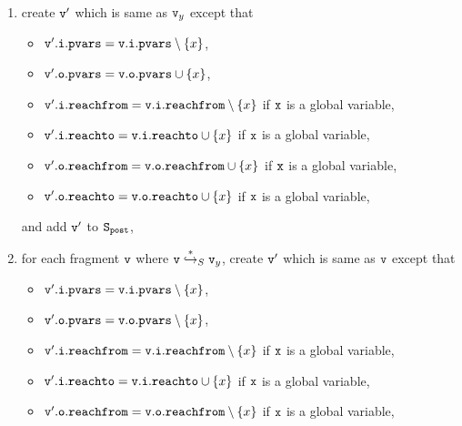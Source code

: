 \begin{description}
\begin{enumerate}
\item create $\mathtt{v}'$ which is same as $\mathtt{v}_y$ except that
\begin{itemize}
\item $\mathtt{v}'.\mathtt{i}.\mathtt{pvars} = \mathtt{v}.\mathtt{i}.\mathtt{pvars} \setminus \left\{x\right\}$,
\item $\mathtt{v}'.\mathtt{o}.\mathtt{pvars} = \mathtt{v}.\mathtt{o}.\mathtt{pvars} \cup \left\{x\right\}$,
\item $\mathtt{v}'.\mathtt{i}.\mathtt{reachfrom} = \mathtt{v}.\mathtt{i}.\mathtt{reachfrom} \setminus \left\{x\right\}$ if $\tt x$ is a global variable,
\item $\mathtt{v}'.\mathtt{i}.\mathtt{reachto} = \mathtt{v}.\mathtt{i}.\mathtt{reachto} \cup \left\{x\right\}$ if $\tt x$ is a global variable,
 \item $\mathtt{v}'.\mathtt{o}.\mathtt{reachfrom} = \mathtt{v}.\mathtt{o}.\mathtt{reachfrom} \cup \left\{x\right\}$ if $\tt x$ is a global variable,
 \item $\mathtt{v}'.\mathtt{o}.\mathtt{reachto} = \mathtt{v}.\mathtt{o}.\mathtt{reachto} \cup \left\{x\right\}$ if $\tt x$ is a global variable,
\end{itemize}
and add $\mathtt{v}'$ to $\tt S_{post}$,
\item  for each fragment $\mathtt{v}$ where $\mathtt{v} \overset{*}\hookrightarrow_S \mathtt{v}_y$, create $\mathtt{v}'$ which is same as $\mathtt{v}$ except that
\begin{itemize}
\item $\mathtt{v}'.\mathtt{i}.\mathtt{pvars} = \mathtt{v}.\mathtt{i}.\mathtt{pvars} \setminus \left\{x\right\}$,
\item $\mathtt{v}'.\mathtt{o}.\mathtt{pvars} = \mathtt{v}.\mathtt{o}.\mathtt{pvars} \setminus \left\{x\right\}$,
\item $\mathtt{v}'.\mathtt{i}.\mathtt{reachfrom} = \mathtt{v}.\mathtt{i}.\mathtt{reachfrom} \setminus \left\{x\right\}$ if $\tt x$ is a global variable,

\item $\mathtt{v}'.\mathtt{i}.\mathtt{reachto} = \mathtt{v}.\mathtt{i}.\mathtt{reachto} \cup \left\{x\right\}$ if $\tt x$ is a global variable,
\item $\mathtt{v}'.\mathtt{o}.\mathtt{reachfrom} = \mathtt{v}.\mathtt{o}.\mathtt{reachfrom} \setminus \left\{x\right\}$ if $\tt x$ is a global variable,


\end{itemize}
\end{enumerate}
\end{description}
